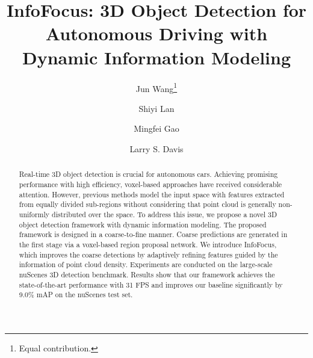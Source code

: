 \documentclass[runningheads]{llncs}
\makeatletter
\newcommand{\printfnsymbol}[1]{\textsuperscript{\@fnsymbol{#1}}}
\makeatother
\begin{document}
\pagestyle{headings}
\mainmatter
\def\ECCVSubNumber{1137}  

\title{InfoFocus: 3D Object Detection for Autonomous Driving with Dynamic Information Modeling} 

\begin{comment}
\titlerunning{ECCV-20 submission ID \ECCVSubNumber} 
\authorrunning{ECCV-20 submission ID \ECCVSubNumber} 
\author{Anonymous ECCV submission}
\institute{Paper ID \ECCVSubNumber}
\end{comment}


\author{Jun Wang\thanks{Equal contribution.} \and
Shiyi Lan\printfnsymbol{1} \and
Mingfei Gao \and
 Larry S. Davis }
\maketitle

\begin{abstract}
Real-time 3D object detection is crucial for autonomous cars. Achieving promising performance with high efficiency, voxel-based approaches have received considerable attention. However, previous methods model the input space with features extracted from equally divided sub-regions without considering that point cloud is generally non-uniformly distributed over the space. To address this issue, we propose a novel 3D object detection framework with dynamic information modeling. The proposed framework is designed in a coarse-to-fine manner. Coarse predictions are generated in the first stage via a voxel-based region proposal network. 
We introduce InfoFocus, which improves the coarse detections by adaptively refining features guided by the information of point cloud density. Experiments are conducted on the large-scale nuScenes 3D detection benchmark. Results show that our framework achieves the state-of-the-art performance with 31 FPS and improves our baseline significantly by 9.0\% mAP on the nuScenes test set.

\end{abstract}
\end{document}
